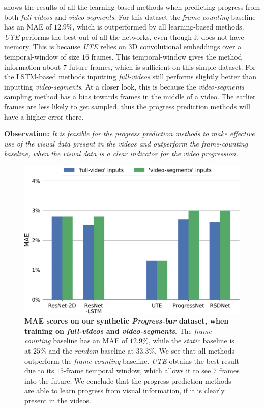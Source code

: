  shows the results of all the learning-based methods when predicting progress from both \textsl{full-videos} and \textsl{video-segments}. 
For this dataset the \textsl{frame-counting} baseline has an MAE of $12.9$\%, which is outperformed by all learning-based methods. 
\textsl{UTE} performs the best out of all the networks, even though it does not have memory. 
This is because \textsl{UTE} relies on 3D convolutional embeddings over a temporal-window of size $16$ frames. 
This temporal-window gives the method information about $7$ future frames, which is sufficient on this simple dataset. 
For the LSTM-based methods inputting \textsl{full-videos} still performs slightly better than inputting \textsl{video-segments}. 
At a closer look, this is because the \textsl{video-segments} sampling method has a bias towards frames in the middle of a video. 
The earlier frames are less likely to get sampled, thus the progress prediction methods will have a higher error there.

\smallskip\noindent\textbf{Observation:} 
\emph{It is feasible for the progress prediction methods to make effective use of the visual data present in the videos and outperform the \textsl{frame-counting} baseline, when the visual data is a clear indicator for the video progression.
}
\begin{figure}
\begin{center}
   \includegraphics[width=1.0\linewidth]{media/results/bars.pdf}
\end{center}
   \caption{\textbf{MAE scores on our synthetic \textsl{Progress-bar} dataset, when training on \textsl{full-videos} and \textsl{video-segments}}. 
   The \textsl{frame-counting} baseline has an MAE of $12.9\%$, while the \textsl{static} baseline is at $25\%$ and the \textsl{random} baseline at $33.3\%$. 
   We see that all methods outperform the \textsl{frame-counting} baseline. 
   \textsl{UTE} obtains the best result due to its $15$-frame temporal window, which allows it to see $7$ frames into the future. 
   We conclude that the progress prediction methods are able to learn progress from visual information, if it is clearly present in the videos.}
\label{fig:result_bars}
\end{figure}